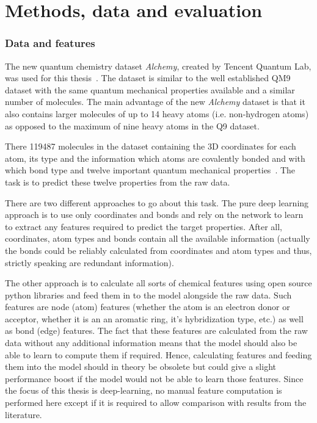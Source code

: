 \chapter{Methods, data and evaluation}
\label{chapter:Methods}


\subsection{Data and features}

The new quantum chemistry dataset \textit{Alchemy}, created by Tencent Quantum Lab, was used for this thesis~\cite{Chen2019}. The dataset is similar to the well established QM9 dataset with the same quantum mechanical properties available and a similar number of molecules. The main advantage of the new \textit{Alchemy} dataset is that it also contains larger molecules of up to 14 heavy atoms (i.e. non-hydrogen atoms) as opposed to the maximum of nine heavy atoms in the Q9 dataset.

There 119487 molecules in the dataset containing the 3D coordinates for each atom, its type and the information which atoms are covalently bonded and with which bond type and twelve important quantum mechanical properties~\cite{Chen2019}. The task is to predict these twelve properties from the raw data.

There are two different approaches to go about this task. The pure deep learning approach is to use only coordinates and bonds and rely on the network to learn to extract any features required to predict the target properties. After all, coordinates, atom types and bonds contain all the available information (actually the bonds could be reliably calculated from coordinates and atom types and thus, strictly speaking are redundant information).

The other approach is to calculate all sorts of chemical features using open source python libraries and feed them in to the model alongside the raw data. Such features are node (atom) features (whether the atom is an electron donor or acceptor, whether it is an an aromatic ring, it's hybridization type, etc.) as well as bond (edge) features. The fact that these features are calculated from the raw data without any additional information means that the model should also be able to learn to compute them if required. Hence, calculating features and feeding them into the model should in theory be obsolete but could give a slight performance boost if the model would not be able to learn those features. Since the focus of this thesis is deep-learning, no manual feature computation is performed here except if it is required to allow comparison with results from the literature.


